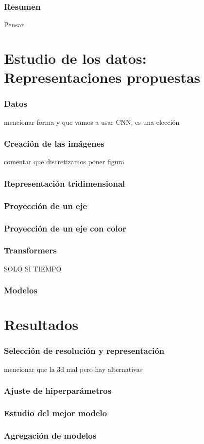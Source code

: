 \documentclass{beamer}
\begin{document}
\begin{frame}
  \frametitle{Resumen}
  Pensar
\end{frame}

\section{Estudio de los datos: Representaciones propuestas}
\begin{frame}
  \frametitle{Datos}
  mencionar forma y que vamos a usar CNN, es una elección
\end{frame}
\begin{frame}
  \frametitle{Creación de las imágenes}
  comentar que discretizamos poner figura
\end{frame}
\begin{frame}
  \frametitle{Representación tridimensional}
\end{frame}
\begin{frame}
  \frametitle{Proyección de un eje}
\end{frame}
\begin{frame}
  \frametitle{Proyección de un eje con color}
\end{frame}
\begin{frame}
  \frametitle{Transformers}
  SOLO SI TIEMPO
\end{frame}
\begin{frame}
  \frametitle{Modelos}
\end{frame}
\section{Resultados}
\begin{frame}
  \frametitle{Selección de resolución y representación}
  mencionar que la 3d mal pero hay alternativas
\end{frame}
\begin{frame}
  \frametitle{Ajuste de hiperparámetros}
\end{frame}
\begin{frame}
  \frametitle{Estudio del mejor modelo}
\end{frame}
\begin{frame}
  \frametitle{Agregación de modelos}
\end{frame}
\end{document}
